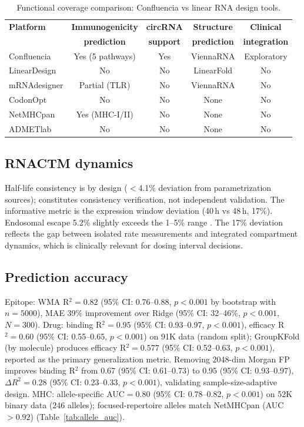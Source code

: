 \begin{table}[t]
\centering
\caption{Functional coverage comparison: Confluencia vs linear RNA design tools.}
\label{tab:coverage}
\begin{tabular}{lcccc}
\toprule
\textbf{Platform} & \textbf{Immunogenicity} & \textbf{circRNA} & \textbf{Structure} & \textbf{Clinical} \\
 & \textbf{prediction} & \textbf{support} & \textbf{prediction} & \textbf{integration} \\
\midrule
Confluencia & Yes (5 pathways) & Yes & ViennaRNA & Exploratory \\
LinearDesign & No & No & LinearFold & No \\
mRNAdesigner & Partial (TLR) & No & ViennaRNA & No \\
CodonOpt & No & No & None & No \\
NetMHCpan & Yes (MHC-I/II) & No & None & No \\
ADMETlab & No & No & None & No \\
\bottomrule
\end{tabular}
\end{table}

\subsection*{RNACTM dynamics}
Half-life consistency is by design ($<$4.1\% deviation from parametrization sources); constitutes consistency verification, not independent validation. The informative metric is the expression window deviation (40\,h vs 48\,h, 17\%). Endosomal escape 5.2\% slightly exceeds the 1--5\% range \citep{gilleron2013}. The 17\% deviation reflects the gap between isolated rate measurements and integrated compartment dynamics, which is clinically relevant for dosing interval decisions.

\subsection*{Prediction accuracy}
Epitope: WMA R$^2{=}0.82$ (95\% CI: 0.76--0.88, $p{<}0.001$ by bootstrap with $n{=}5000$), MAE 39\% improvement over Ridge (95\% CI: 32--46\%, $p{<}0.001$, $N{=}300$). Drug: binding R$^2{=}0.95$ (95\% CI: 0.93--0.97, $p{<}0.001$), efficacy R$^2{=}0.60$ (95\% CI: 0.55--0.65, $p{<}0.001$) on 91K data (random split); GroupKFold (by molecule) produces efficacy R$^2{=}0.577$ (95\% CI: 0.52--0.63, $p{<}0.001$), reported as the primary generalization metric. Removing 2048-dim Morgan FP improves binding R$^2$ from 0.67 (95\% CI: 0.61--0.73) to 0.95 (95\% CI: 0.93--0.97), $\Delta R^2{=}0.28$ (95\% CI: 0.23--0.33, $p{<}0.001$), validating sample-size-adaptive design. MHC: allele-specific AUC${=}0.80$ (95\% CI: 0.78--0.82, $p{<}0.001$) on 52K binary data (246 alleles); focused-repertoire alleles match NetMHCpan (AUC${>}0.92$) (Table~\ref{tab:allele_auc}).


